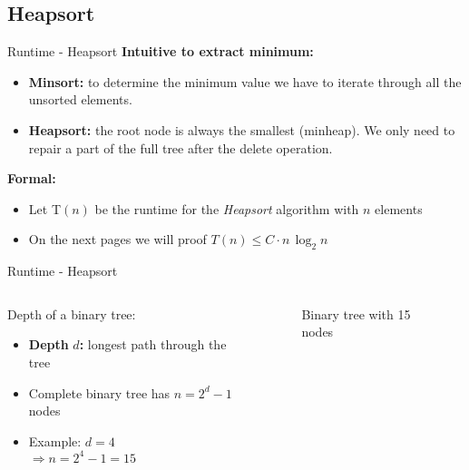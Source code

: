 \subsection{Heapsort}

\begin{frame}{Runtime - Heapsort}
  \textbf{Intuitive to extract minimum:}
  \begin{itemize}
    \item<1- |handout:1>
      \textbf{Minsort:}
      to determine the minimum value we have to iterate through all the
      unsorted elements.
    \item<2- |handout:1>
      \textbf{Heapsort:}
      the root node is always the smallest (minheap).
      We only need to repair a part of the full tree after the delete
      operation.
  \end{itemize}
  \textbf{Formal:}
  \begin{itemize}
    \item<4- |handout:1>
      Let {\color{MainA}T$(n)$} be the runtime for the \textit{Heapsort}
      algorithm with {\color{MainA}$n$} elements
    \item<5- |handout:1>
      On the next pages we will proof
      {\color{MainA}$T(n) \leq C \cdot n \, \log_2 n$}
  \end{itemize}
\end{frame}


\begin{frame}{Runtime - Heapsort}
  \begin{columns}
    \begin{column}{0.5\textwidth}
      Depth of a binary tree:
      \begin{itemize}
        \item
          \textbf{Depth} {\color{MainA}$d$}\textbf{:}
          longest path through the tree
        \item
          Complete binary tree has {\color{MainA}$n = 2^d - 1$} nodes
        \item
          Example: {\color{MainA}$d = 4$}\\
          {\color{MainA}$\Rightarrow n = 2^4 - 1 = 15$}
      \end{itemize}
    \end{column}
    \begin{column}{0.5\textwidth}
      \begin{figure}
        \begin{adjustbox}{width=\linewidth}
        \end{adjustbox}
        \caption{Binary tree with 15 nodes}%
        \label{fig:binary_tree}%
      \end{figure}
    \end{column}
  \end{columns}
\end{frame}
